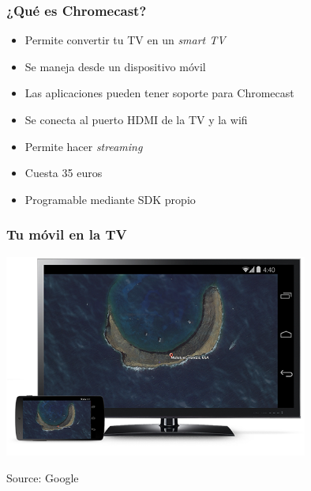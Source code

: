 
\begin{frame}
\frametitle{¿Qué es Chromecast?}

\begin{itemize}
   \item Permite convertir tu TV en un \emph{smart TV}
   \item Se maneja desde un dispositivo móvil
   \item Las aplicaciones pueden tener soporte para Chromecast
   \item Se conecta al puerto HDMI de la TV y la wifi
   \item Permite hacer \emph{streaming}
   \item Cuesta 35 euros
   \item Programable mediante SDK propio
\end{itemize}

\end{frame}



\begin{frame}
\frametitle{Tu móvil en la TV}

\begin{center}
  \includegraphics[width=10cm]{figs/mirror.png}
\end{center}


\begin{flushright}
{\tiny
Source: Google
}
\end{flushright}

\end{frame}


